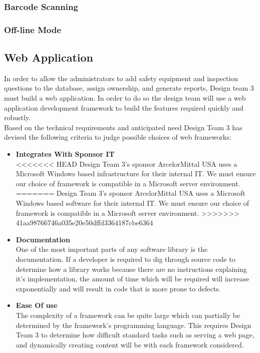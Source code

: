 \documentclass[Letter,11pt]{article}
\begin{document}
	\subsubsection{Barcode Scanning}

	\subsubsection{Off-line Mode}

	\subsection{Web Application}
		In order to allow the administrators to add safety equipment and inspection questions to the database, assign ownership, and generate reports, Design team 3 must build a web application. In order to do so the design team will use a web application development framework to build the features required quickly and robustly.
		\\
		Based on the technical requirements and anticipated need Design Team 3 has devised the following criteria to judge possible choices of web frameworks:
		\\
		\begin{minipage}[t]{0.5\textwidth}
		\begin{itemize}
			\item \textbf{Integrates With Sponsor IT}\\
<<<<<<< HEAD
			Design Team 3's sponsor ArcelorMittal USA uses a Microsoft Windows based infrastructure for their internal IT. We must ensure our choice of framework is compatible in a Microsoft server environment.
=======
			Design Team 3's sponsor ArcelorMittal USA uses a Microsoft Windows based software for their internal IT. We must ensure our choice of framework is compatible in a Microsoft server environment.
>>>>>>> 41aa98766746a035e20e50dffd3364187cbe6364

			\item \textbf{Documentation}\\
			One of the most important parts of any software library is the documentation. If a developer is required to dig through source code to determine how a library works because there are no instructions explaining it's implementation, the amount of time which will be required will increase exponentially and will result in code that is more prone to defects.

			\item \textbf{Ease Of use} \\
			The complexity of a framework can be quite large which can partially be determined by the framework's programming language. This requires Design Team 3 to determine how difficult standard tasks such as serving a web page, and dynamically creating content will be with each framework considered.
		\end{itemize}
		\end{minipage}
\end{document}
